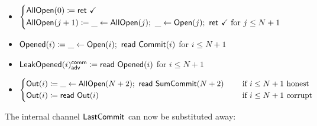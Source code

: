 \begin{itemize}
\item {\color{teal} $\begin{cases*} \AllOpen(0) \coloneqq \ret{\checkmark} \\ \AllOpen(j+1) \coloneqq \_ \leftarrow \AllOpen(j); \ \_ \leftarrow \Open(j); \ \ret{\checkmark} \text{ for $j \leq N+1$} \end{cases*}$}
\item {\color{red} $\mathsf{Opened}(i) \coloneqq \_ \leftarrow \mathsf{Open}(i); \ \mathsf{read} \ \mathsf{Commit}(i)$ for $i \leq N+1$}
\item {\color{red} $\mathsf{LeakOpened}(i)^{\mathsf{comm}}_{\mathsf{adv}} \coloneqq \mathsf{read} \ \mathsf{Opened}(i)$ for $i \leq N+1$}
\item $\begin{cases*} \Out(i) \coloneqq \_ \leftarrow \AllOpen(N+2); \ \read{\SumCommit(N+2)} & \hspace{10pt} \text{if $i \leq N+1$ honest} \\ \Out(i) \coloneqq \read{\Out(i)} & \hspace{10pt} \text{if $i \leq N+1$ corrupt} \end{cases*}$
\end{itemize}

\noindent The internal channel $\mathsf{LastCommit}$ can now be substituted away:

